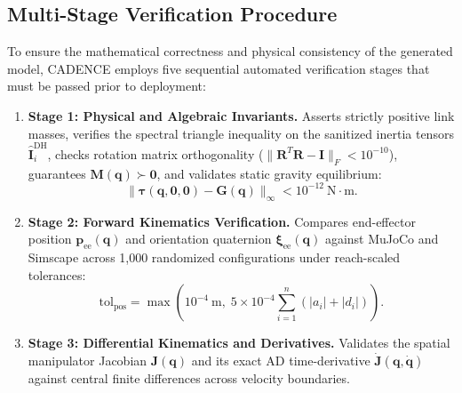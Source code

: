 \documentclass[fleqn,10pt]{article}
\begin{document}
\subsection{Multi-Stage Verification Procedure}
\label{subsec:verification_suite}
To ensure the mathematical correctness and physical consistency of the generated model, CADENCE employs five sequential automated verification stages that must be passed prior to deployment:

\begin{enumerate}
	\item \textbf{Stage 1: Physical and Algebraic Invariants.} Asserts strictly positive link masses, verifies the spectral triangle inequality on the sanitized inertia tensors $\hat{\bm{I}}_i^{\text{DH}}$, checks rotation matrix orthogonality ($\|\bm{R}^T\bm{R} - \bm{I}\|_F < 10^{-10}$), guarantees $\bm{M}(\bm{q}) \succ \bm{0}$, and validates static gravity equilibrium:
	\begin{equation}
		\|\bm{\tau}(\bm{q},\bm{0},\bm{0}) - \bm{G}(\bm{q})\|_\infty < 10^{-12}~\text{N}\cdot\text{m}.
	\end{equation}
	
	\item \textbf{Stage 2: Forward Kinematics Verification.} Compares end-effector position $\bm{p}_{\text{ee}}(\bm{q})$ and orientation quaternion $\bm{\xi}_{\text{ee}}(\bm{q})$ \cite{shepperd1978quaternion} against MuJoCo and Simscape across 1,000 randomized configurations under reach-scaled tolerances:
	\begin{equation}
		\text{tol}_{\text{pos}} = \max\!\left(10^{-4}~\text{m}, \; 5 \times 10^{-4} \sum_{i=1}^n (|a_i| + |d_i|)\right).
	\end{equation}
	
	\item \textbf{Stage 3: Differential Kinematics and Derivatives.} Validates the spatial manipulator Jacobian $\bm{J}(\bm{q})$ and its exact AD time-derivative $\dot{\bm{J}}(\bm{q},\dot{\bm{q}})$ against central finite differences across velocity boundaries.
	

\end{enumerate}
\end{document}
